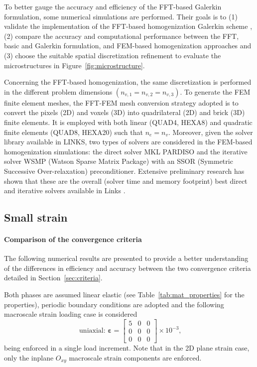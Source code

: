 To better gauge the accuracy and efficiency of the FFT-based Galerkin formulation, some numerical simulations are performed.
Their goals is to (1) validate the implementation of the FFT-based homogenization Galerkin scheme \citep{vondrejc_fft-based_2014, zeman_finite_2017, de_geus_finite_2017}, (2) compare the accuracy and computational performance between the FFT, basic \citep{moulinec_fast_1994} and Galerkin formulation, and FEM-based homogenization approaches and (3) choose the suitable spatial discretization refinement to evaluate the microstructures in Figure~\ref{fig:microstructure}.

Concerning the FFT-based homogenization, the same discretization is performed in the different problem dimensions \(\left(n_{v, 1}=n_{v, 2}=n_{v, 3}\right)\).
To generate the FEM finite element meshes, the FFT-FEM mesh conversion strategy adopted is to convert the pixels (2D) and voxels (3D) into quadrilateral (2D) and brick (3D) finite elements.
It is employed with both linear (QUAD4, HEXA8) and quadratic finite elements (QUAD8, HEXA20) such that \(n_{e}=n_{v}\).
Moreover, given the solver library available in LINKS, two types of solvers are considered in the FEM-based homogenization simulations: the direct solver MKL PARDISO \citep{schenk2001pardiso, schenk2004solving} and the iterative solver WSMP (Watson Sparse Matrix Package) \citep{gupta_improved_2002, gupta_wsmp_2002} with an SSOR (Symmetric Successive Over-relaxation) preconditioner.
Extensive preliminary research has shown that these are the overall (solver time and memory footprint) best direct and iterative solvers available in Links \citep{cardoso_coelho_election_2019}.

\subsection{Small strain}

\paragraph{Comparison of the convergence criteria}
The following numerical results are presented to provide a better understanding of the differences in efficiency and accuracy between the two convergence criteria detailed in Section~\ref{sec:criteria}.

Both phases are assumed linear elastic (see Table~\ref{tab:mat_properties} for the properties), periodic boundary conditions are adopted and the following macroscale strain loading case is considered
\begin{equation}
\text { uniaxial: } \bm{\varepsilon}=\left[\begin{array}{lll}
5 & 0 & 0 \\
0 & 0 & 0 \\
0 & 0 & 0
\end{array}\right] \times 10^{-3},
\end{equation}
being enforced in a single load increment.
Note that in the 2D plane strain case, only the inplane \(O_{x y}\) macroscale strain components are enforced.

